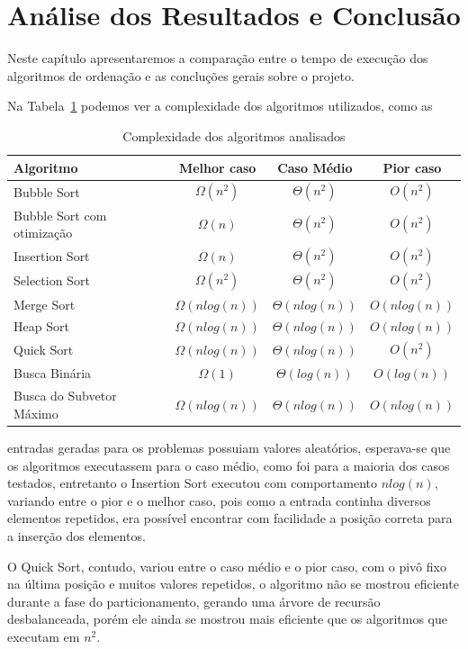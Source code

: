 \section{Análise dos Resultados e Conclusão}
Neste capítulo apresentaremos a comparação entre o tempo de execução dos algoritmos de ordenação e as concluções gerais sobre o projeto.

Na Tabela~\ref{tab:complexidade} podemos ver a complexidade dos algoritmos utilizados, como as
\renewcommand{\arraystretch}{1.5}
  \begin{table}[h]
    \centering
    \begin{tabular}[h]{|l|c|c|c|} \hline
      Algoritmo & Melhor caso & Caso Médio & Pior caso \\ \hline
      Bubble Sort & $\Omega(n^2)$ & $\Theta(n^2)$ & $O(n^2)$ \\ \hline
      Bubble Sort com otimização& $\Omega(n)$ & $\Theta(n^2)$ & $O(n^2)$ \\ \hline
      Insertion Sort & $\Omega(n)$ & $\Theta(n^2)$ & $O(n^2)$ \\ \hline
      Selection Sort & $\Omega(n^2)$ & $\Theta(n^2)$ & $O(n^2)$ \\ \hline
      Merge Sort & $\Omega(nlog(n))$ & $\Theta(nlog(n))$ & $O(nlog(n))$ \\ \hline
      Heap Sort & $\Omega(nlog(n))$ & $\Theta(nlog(n))$ & $O(nlog(n))$ \\ \hline
      Quick Sort & $\Omega(nlog(n))$ & $\Theta(nlog(n))$ & $O(n^2)$ \\ \hline
      Busca Binária & $\Omega(1)$ & $\Theta(log(n))$ & $O(log(n))$ \\ \hline
      Busca do Subvetor Máximo & $\Omega(nlog(n))$ & $\Theta(nlog(n))$ & $O(nlog(n))$ \\ \hline
    \end{tabular}
    \caption{Complexidade dos algoritmos analisados}
    \label{tab:complexidade}
  \end{table}
  entradas geradas para os problemas possuiam valores aleatórios, esperava-se que os algoritmos executassem para o caso médio, como foi para a maioria dos casos testados, entretanto o Insertion Sort executou com comportamento $nlog(n)$, variando entre o pior e o melhor caso, pois como a entrada continha diversos elementos repetidos, era possível encontrar com facilidade a posição correta para a inserção dos elementos.

  O Quick Sort, contudo, variou entre o caso médio e o pior caso, com o pivô fixo na última posição e muitos valores repetidos, o algoritmo não se mostrou eficiente durante a fase do particionamento, gerando uma árvore de recursão desbalanceada, porém ele ainda se mostrou mais eficiente que os algoritmos que executam em $n^2$.

